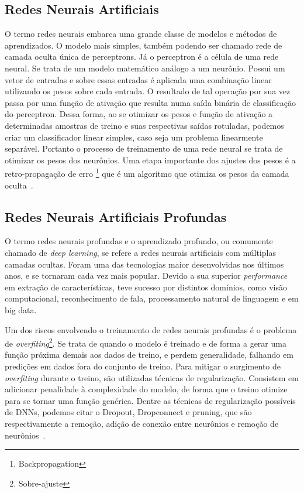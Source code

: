 \subsection{Redes Neurais Artificiais}\label{sec:Cap2_redes_neurais}

O termo redes neurais embarca uma grande classe de modelos e métodos de aprendizados. O modelo mais simples, também podendo ser chamado rede de camada oculta única de perceptrons. Já o  perceptron é a célula de uma rede neural. Se trata de um modelo matemático análogo a um neurônio. Possui um vetor de entradas e sobre essas entradas é aplicada uma combinação linear utilizando os pesos sobre cada entrada. O resultado de tal operação por sua vez passa por uma função de ativação que resulta numa saída binária de classificação do perceptron. Dessa forma, ao se otimizar os pesos e função de ativação a determinadas amostras de treino e suas respectivas saídas rotuladas, podemos criar um classificador linear simples, caso seja um problema linearmente separável. Portanto o processo de treinamento de uma rede neural se trata de otimizar os pesos dos neurônios. Uma etapa importante dos ajustes dos pesos é a retro-propagação de erro \footnote{Backpropagation} que é um algoritmo que otimiza os pesos da camada oculta~\cite{hastie01statisticallearning}.

\subsection{Redes Neurais Artificiais Profundas}\label{sec:Cap2_redes_neurais_profundas}
O termo redes neurais profundas e o aprendizado profundo, ou comumente chamado de \textit{deep learning}, se refere a redes neurais artificiais com múltiplas camadas ocultas. Foram uma das tecnologias maior desenvolvidas nos últimos anos, e se tornaram cada vez mais popular. Devido a sua superior \textit{performance} em extração de características, teve sucesso por distintos domínios, como visão computacional, reconhecimento de fala, processamento natural de linguagem e em big data.

Um dos riscos envolvendo o treinamento de redes neurais profundas é o problema de \textit{overfiting}\footnote{Sobre-ajuste}. Se trata de quando o modelo é treinado e de forma a gerar uma função próxima demais aos dados de treino, e perdem generalidade, falhando em predições em dados fora do conjunto de treino. Para mitigar o surgimento de \textit{overfiting} durante o treino, são utilizadas técnicas de regularização. Consistem em adicionar penalidade à complexidade do modelo, de forma que o treino otimize para se tornar uma função genérica. Dentre as técnicas de regularização possíveis de DNNs, podemos citar o Dropout, Dropconnect e pruning, que são respectivamente a remoção, adição de conexão entre neurônios e remoção de neurônios~\cite{hastie01statisticallearning}.


